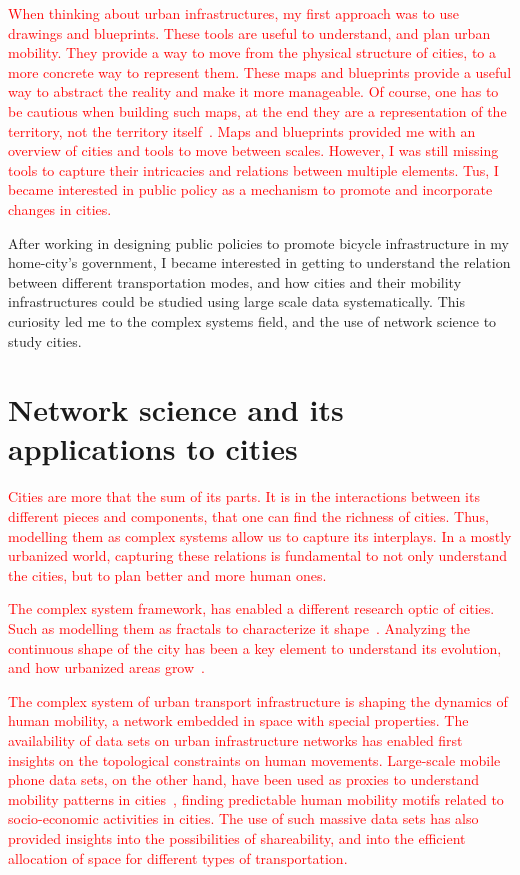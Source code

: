 \textcolor{red}{When thinking about urban infrastructures, my first approach was to use drawings and blueprints. These tools are useful to understand, and plan urban mobility. They provide a way to move from the physical structure of cities, to a more concrete way to represent them. These maps and blueprints provide a useful way to abstract the reality and make it more manageable. Of course, one has to be cautious when building such maps, at the end they are a representation of the territory, not the territory itself~\cite{borges1961hacedor}. Maps and blueprints provided me with an overview of cities and tools to move between scales. However, I was still missing tools to capture their intricacies and relations between multiple elements. Tus, I became interested in public policy as a mechanism to promote and incorporate changes in cities.}

After working in designing public policies to promote bicycle infrastructure in my home-city's government, I became interested in getting to understand the relation between different transportation modes, and how cities and their mobility infrastructures could be studied using large scale data systematically. This curiosity led me to the complex systems field, and the use of network science to study cities.

\section{Network science and its applications to cities}

\textcolor{red}{Cities are more that the sum of its parts. It is in the interactions between its different pieces and components, that one can find the richness of cities. Thus, modelling them as complex systems allow us to capture its interplays. In a mostly urbanized world, capturing these relations is fundamental to not only understand the cities, but to plan better and more human ones.}

\textcolor{red}{The complex system framework, has enabled a different research optic of cities. Such as modelling them as fractals to characterize it shape~\cite{batty1996preliminary}. Analyzing the continuous shape of the city has been a key element to understand its evolution, and how urbanized areas grow~\cite{makse1995growth}.}

\textcolor{red}{The complex system of urban transport infrastructure is shaping the dynamics of human mobility, a network embedded in space with special properties. The availability of data sets on urban infrastructure networks has enabled first insights on the topological constraints on human movements. Large-scale mobile phone data sets, on the other hand, have been used as proxies to understand mobility patterns in cities~\cite{gonzalez2008understanding}, finding predictable human mobility motifs related to socio-economic activities in cities. The use of such massive data sets has also provided insights into the possibilities of shareability, and into the efficient allocation of space for different types of transportation.}


